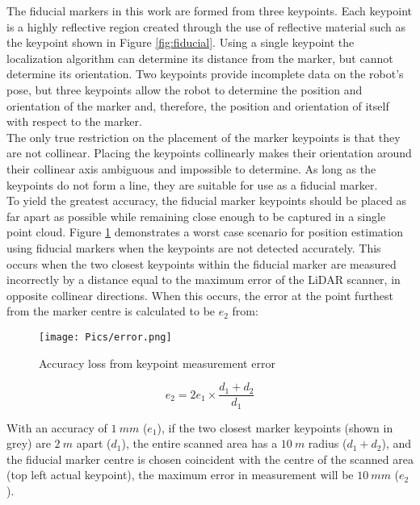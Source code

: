 The fiducial markers in this work are formed from three keypoints. Each keypoint is a highly reflective region created through the use of reflective material such as the keypoint shown in Figure \ref{fig:fiducial}. Using a single keypoint the localization algorithm can determine its distance from the marker, but cannot determine its orientation. Two keypoints provide incomplete data on the robot's pose, but three keypoints allow the robot to determine the position and orientation of the marker and, therefore, the position and orientation of itself with respect to the marker.\\

The only true restriction on the placement of the marker keypoints is that they are not collinear. Placing the keypoints collinearly makes their orientation around their collinear axis ambiguous and impossible to determine. As long as the keypoints do not form a line, they are suitable for use as a fiducial marker.\\

To yield the greatest accuracy, the fiducial marker keypoints should be placed as far apart as possible while remaining close enough to be captured in a single point cloud. Figure \ref{fig:resacc} demonstrates a worst case scenario for position estimation using fiducial markers when the keypoints are not detected accurately. This occurs when the two closest keypoints within the fiducial marker are measured incorrectly by a distance equal to the maximum error of the LiDAR scanner, in opposite collinear directions. When this occurs, the error at the point furthest from the marker centre is calculated to be $e_2$ from:

\begin{figure}
\texttt{[image: Pics/error.png]}
\caption{Accuracy loss from keypoint measurement error}
\label{fig:resacc} 
\end{figure}

\begin{equation}
   e_2 = 2e_1\times\frac{d_1+d_2}{d_1}\label{eq:2}
\end{equation}

With an accuracy of $1\ mm$ ($e_1$), if the two closest marker keypoints (shown in grey) are $2\ m$ apart ($d_1$), the entire scanned area has a $10\ m$ radius ($d_1+d_2$), and the fiducial marker centre is chosen coincident with the centre of the scanned area (top left actual keypoint), the maximum error in measurement will be $10\ mm$ ($e_2$).\\

